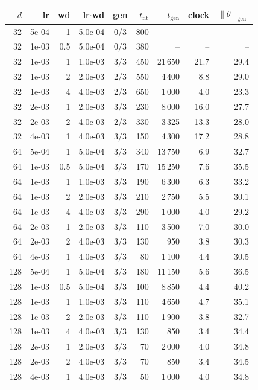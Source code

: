\begin{tabular}{rrrrcrrrr}
\toprule
$d$ & lr & wd & lr$\cdot$wd & gen & $t_{\mathrm{fit}}$ & $t_{\mathrm{gen}}$ & clock & $\|\theta\|_{\mathrm{gen}}$ \\
\midrule
32 & 5e-04 & 1 & 5.0e-04 & 0/3 & 800 & -- & -- & -- \\
32 & 1e-03 & 0.5 & 5.0e-04 & 0/3 & 380 & -- & -- & -- \\
32 & 1e-03 & 1 & 1.0e-03 & 3/3 & 450 & 21\,650 & 21.7 & 29.4 \\
32 & 1e-03 & 2 & 2.0e-03 & 2/3 & 550 & 4\,400 & 8.8 & 29.0 \\
32 & 1e-03 & 4 & 4.0e-03 & 2/3 & 650 & 1\,000 & 4.0 & 23.3 \\
32 & 2e-03 & 1 & 2.0e-03 & 3/3 & 230 & 8\,000 & 16.0 & 27.7 \\
32 & 2e-03 & 2 & 4.0e-03 & 2/3 & 330 & 3\,325 & 13.3 & 28.0 \\
32 & 4e-03 & 1 & 4.0e-03 & 3/3 & 150 & 4\,300 & 17.2 & 28.8 \\
64 & 5e-04 & 1 & 5.0e-04 & 3/3 & 340 & 13\,750 & 6.9 & 32.7 \\
64 & 1e-03 & 0.5 & 5.0e-04 & 3/3 & 170 & 15\,250 & 7.6 & 35.5 \\
64 & 1e-03 & 1 & 1.0e-03 & 3/3 & 190 & 6\,300 & 6.3 & 33.2 \\
64 & 1e-03 & 2 & 2.0e-03 & 3/3 & 210 & 2\,750 & 5.5 & 30.1 \\
64 & 1e-03 & 4 & 4.0e-03 & 3/3 & 290 & 1\,000 & 4.0 & 29.2 \\
64 & 2e-03 & 1 & 2.0e-03 & 3/3 & 110 & 3\,500 & 7.0 & 30.0 \\
64 & 2e-03 & 2 & 4.0e-03 & 3/3 & 130 & 950 & 3.8 & 30.3 \\
64 & 4e-03 & 1 & 4.0e-03 & 3/3 & 80 & 1\,100 & 4.4 & 30.5 \\
128 & 5e-04 & 1 & 5.0e-04 & 3/3 & 180 & 11\,150 & 5.6 & 36.5 \\
128 & 1e-03 & 0.5 & 5.0e-04 & 3/3 & 100 & 8\,850 & 4.4 & 40.2 \\
128 & 1e-03 & 1 & 1.0e-03 & 3/3 & 110 & 4\,650 & 4.7 & 35.1 \\
128 & 1e-03 & 2 & 2.0e-03 & 3/3 & 110 & 1\,900 & 3.8 & 32.7 \\
128 & 1e-03 & 4 & 4.0e-03 & 3/3 & 130 & 850 & 3.4 & 34.4 \\
128 & 2e-03 & 1 & 2.0e-03 & 3/3 & 70 & 2\,000 & 4.0 & 34.8 \\
128 & 2e-03 & 2 & 4.0e-03 & 3/3 & 70 & 850 & 3.4 & 34.5 \\
128 & 4e-03 & 1 & 4.0e-03 & 3/3 & 50 & 1\,000 & 4.0 & 34.8 \\
\bottomrule
\end{tabular}
